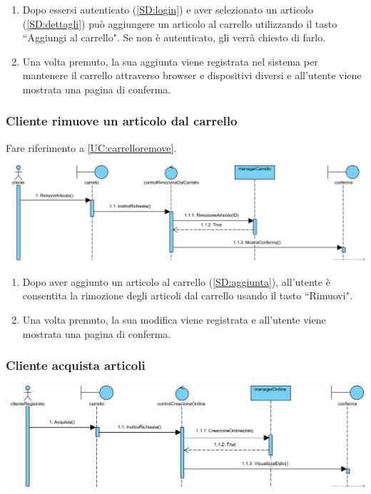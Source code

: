 \documentclass[12pt]{article}
\begin{document}
\begin{enumerate}
\item Dopo essersi autenticato (\ref{SD:login}) e aver selezionato un articolo (\ref{SD:dettagli}) può aggiungere un articolo al carrello utilizzando il tasto ``Aggiungi al carrello". Se non è autenticato, gli verrà chiesto di farlo.

\item Una volta premuto, la sua aggiunta viene registrata nel sistema per mantenere il carrello attraverso browser e dispositivi diversi e all'utente viene mostrata una pagina di conferma.
\end{enumerate}

\subsubsection{Cliente rimuove un articolo dal carrello}
\label{SD:rimozione}

Fare riferimento a \ref{UC:carrelloremove}. \\

\begin{center}
\includegraphics[width=\textwidth]{SequenceDiagram/ClienteCarrelloRimuove}
\end{center}

\begin{enumerate}
\item Dopo aver aggiunto un articolo al carrello (\ref{SD:aggiunta}), all'utente è consentita la rimozione degli articoli dal carrello usando il tasto ``Rimuovi".
\item Una volta premuto, la sua modifica viene registrata e all'utente viene mostrata una pagina di conferma.
\end{enumerate}

\newpage

\subsubsection{Cliente acquista articoli}
\label{SD:acquista}

\begin{center}
\includegraphics[width=\textwidth]{SequenceDiagram/ClienteArticoloAcquista}
\end{center}
\end{document}
